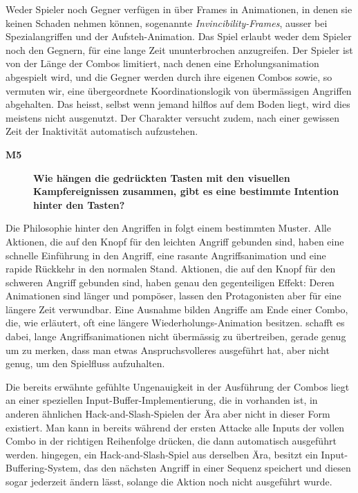 \documentclass[../Main.tex]{subfiles}
\begin{document}
Weder Spieler noch Gegner verfügen in  über Frames in Animationen, in denen sie keinen Schaden nehmen können, sogenannte \textit{Invincibility-Frames}, ausser bei Spezialangriffen und der Aufsteh-Animation. Das Spiel erlaubt weder dem Spieler noch den Gegnern, für eine lange Zeit ununterbrochen anzugreifen. Der Spieler ist von der Länge der Combos limitiert, nach denen eine Erholungsanimation abgespielt wird, und die Gegner werden durch ihre eigenen Combos sowie, so vermuten wir, eine übergeordnete Koordinationslogik von übermässigen Angriffen abgehalten. Das heisst, selbst wenn jemand hilflos auf dem Boden liegt, wird dies meistens nicht ausgenutzt. Der Charakter versucht zudem, nach einer gewissen Zeit der Inaktivität automatisch aufzustehen.

\begin{description}
    \item[\textbf{M5}] \textbf{Wie hängen die gedrückten Tasten mit den visuellen Kampfereignissen zusammen, gibt es eine bestimmte Intention hinter den Tasten?}
\end{description}

\begingroup\color{red}Die Philosophie hinter den Angriffen in  folgt einem bestimmten Muster. Alle Aktionen, die auf den Knopf für den leichten Angriff gebunden sind, haben eine schnelle Einführung in den Angriff, eine rasante Angriffsanimation und eine rapide Rückkehr in den normalen Stand. Aktionen, die auf den Knopf für den schweren Angriff gebunden sind, haben genau den gegenteiligen Effekt: Deren Animationen sind länger und pompöser, lassen den Protagonisten aber für eine längere Zeit verwundbar. Eine Ausnahme bilden Angriffe am Ende einer Combo, die, wie erläutert, oft eine längere Wiederholungs-Animation besitzen.  schafft es dabei, lange Angriffsanimationen nicht übermässig zu übertreiben, gerade genug um zu merken, dass man etwas Anspruchsvolleres ausgeführt hat, aber nicht genug, um den Spielfluss aufzuhalten.

Die bereits erwähnte gefühlte Ungenauigkeit in der Ausführung der Combos liegt an einer speziellen Input-Buffer-Implementierung, die in  vorhanden ist, in anderen ähnlichen Hack-and-Slash-Spielen der Ära aber nicht in dieser Form existiert. Man kann in  bereits während der ersten Attacke alle Inputs der vollen Combo in der richtigen Reihenfolge drücken, die dann automatisch ausgeführt werden.  hingegen, ein Hack-and-Slash-Spiel aus derselben Ära, besitzt ein Input-Buffering-System, das den nächsten Angriff in einer Sequenz speichert und diesen sogar jederzeit ändern lässt, solange die Aktion noch nicht ausgeführt wurde.\autocite{dmcwiki_inputbuffering}\endgroup
\end{document}
